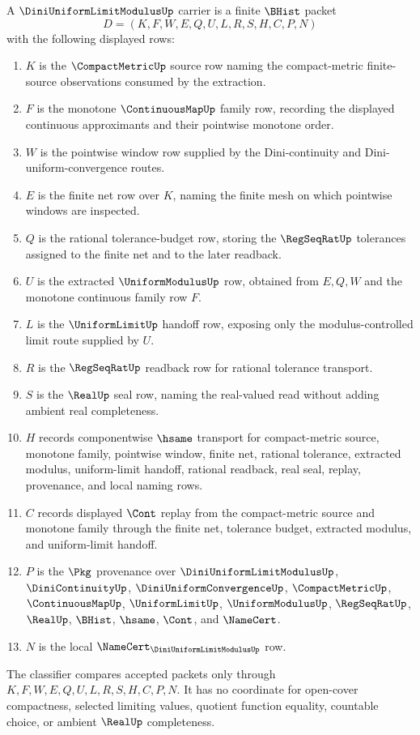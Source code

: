 \begin{definition}
\label{def:dini-uniform-limit-modulus-carrier}
A $\DiniUniformLimitModulusUp$ carrier is a finite $\BHist$ packet
$$
D=(K,F,W,E,Q,U,L,R,S,H,C,P,N)
$$
with the following displayed rows:
\begin{enumerate}
\item $K$ is the $\CompactMetricUp$ source row naming the compact-metric finite-source observations consumed by the extraction.
\item $F$ is the monotone $\ContinuousMapUp$ family row, recording the displayed continuous approximants and their pointwise monotone order.
\item $W$ is the pointwise window row supplied by the Dini-continuity and Dini-uniform-convergence routes.
\item $E$ is the finite net row over $K$, naming the finite mesh on which pointwise windows are inspected.
\item $Q$ is the rational tolerance-budget row, storing the $\RegSeqRatUp$ tolerances assigned to the finite net and to the later readback.
\item $U$ is the extracted $\UniformModulusUp$ row, obtained from $E,Q,W$ and the monotone continuous family row $F$.
\item $L$ is the $\UniformLimitUp$ handoff row, exposing only the modulus-controlled limit route supplied by $U$.
\item $R$ is the $\RegSeqRatUp$ readback row for rational tolerance transport.
\item $S$ is the $\RealUp$ seal row, naming the real-valued read without adding ambient real completeness.
\item $H$ records componentwise $\hsame$ transport for compact-metric source, monotone family, pointwise window, finite net, rational tolerance, extracted modulus, uniform-limit handoff, rational readback, real seal, replay, provenance, and local naming rows.
\item $C$ records displayed $\Cont$ replay from the compact-metric source and monotone family through the finite net, tolerance budget, extracted modulus, and uniform-limit handoff.
\item $P$ is the $\Pkg$ provenance over $\DiniUniformLimitModulusUp$, $\DiniContinuityUp$, $\DiniUniformConvergenceUp$, $\CompactMetricUp$, $\ContinuousMapUp$, $\UniformLimitUp$, $\UniformModulusUp$, $\RegSeqRatUp$, $\RealUp$, $\BHist$, $\hsame$, $\Cont$, and $\NameCert$.
\item $N$ is the local $\NameCert_{\DiniUniformLimitModulusUp}$ row.
\end{enumerate}
The classifier compares accepted packets only through $K,F,W,E,Q,U,L,R,S,H,C,P,N$. It has no coordinate for open-cover compactness, selected limiting values, quotient function equality, countable choice, or ambient $\RealUp$ completeness.
\end{definition}


